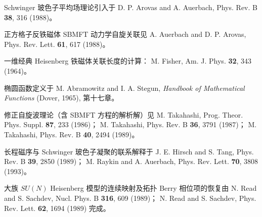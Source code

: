 \begin{chapbib}
\item Schwinger 玻色子平均场理论引入于
  D. P. Arovas and A. Auerbach, Phys. Rev. B \textbf{38}, 316 (1988)。
\item 正方格子反铁磁体 SBMFT 动力学自旋关联见
  A. Auerbach and D. P. Arovas, Phys. Rev. Lett. \textbf{61}, 617 (1988)。
\item 一维经典 Heisenberg 铁磁体关联长度的计算：
  M. Fisher, Am. J. Phys. \textbf{32}, 343 (1964)。
\item 椭圆函数定义于
  M. Abramowitz and I. A. Stegun, \textit{Handbook of Mathematical Functions} (Dover, 1965), 第十七章。
\item 修正自旋波理论（含 SBMFT 方程的解析解）见
  M. Takahashi, Prog. Theor. Phys. Suppl. \textbf{87}, 233 (1986)；
  M. Takahashi, Phys. Rev. B \textbf{36}, 3791 (1987)；
  M. Takahashi, Phys. Rev. B \textbf{40}, 2494 (1989)。
\item 长程磁序与 Schwinger 玻色子凝聚的联系解释于
  J. E. Hirsch and S. Tang, Phys. Rev. B \textbf{39}, 2850 (1989)；
  M. Raykin and A. Auerbach, Phys. Rev. Lett. \textbf{70}, 3808 (1993)。
\item 大族 $SU(N)$ Heisenberg 模型的连续映射及拓扑 Berry 相位项的恢复由
  N. Read and S. Sachdev, Nucl. Phys. B \textbf{316}, 609 (1989)；
  N. Read and S. Sachdev, Phys. Rev. Lett. \textbf{62}, 1694 (1989)
  完成。
\end{chapbib}
